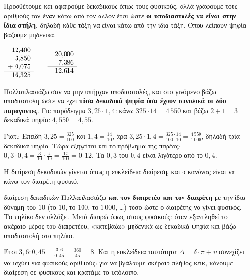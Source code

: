

Προσθέτουμε και αφαιρούμε δεκαδικούς όπως τους φυσικούς, αλλά γράφουμε τους αριθμούς τον έναν κάτω από τον άλλον έτσι ώστε \textbf{οι υποδιαστολές να είναι στην ίδια στήλη}, δηλαδή κάθε τάξη να είναι κάτω από την ίδια τάξη. Όπου λείπουν ψηφία βάζουμε μηδενικά.
\begin{center}
$\begin{array}{r@{}l}
 12&{,}400\\
 3&{,}850\\
 {+}\ 0&{,}075\\\hline
 16&{,}325
\end{array}\qquad
\begin{array}{r@{}l}
 20&{,}000\\
 {-}\ 7&{,}386\\\hline
 12&{,}614
\end{array}$
\end{center}


Πολλαπλασιάζω σαν να μην υπήρχαν υποδιαστολές, και στο γινόμενο βάζω υποδιαστολή ώστε να έχει \textbf{τόσα δεκαδικά ψηφία όσα έχουν συνολικά οι δύο παράγοντες}. Για παράδειγμα $3{,}25\cdot1{,}4$: κάνω $325\cdot14=4\,550$ και βάζω $2+1=3$ δεκαδικά ψηφία: $4{,}550=4{,}55$.

Γιατί; Επειδή $3{,}25=\frac{325}{100}$ και $1{,}4=\frac{14}{10}$, άρα $3{,}25\cdot1{,}4=\frac{325\cdot14}{100\cdot10}=\frac{4\,550}{1\,000}$, δηλαδή τρία δεκαδικά ψηφία. Τώρα εξηγείται και το πρόβλημα της παρέας: $0{,}3\cdot0{,}4=\frac{3}{10}\cdot\frac{4}{10}=\frac{12}{100}=0{,}12$. Τα $0{,}3$ του $0{,}4$ είναι λιγότερο από το $0{,}4$.


Η διαίρεση δεκαδικών γίνεται όπως η ευκλείδεια διαίρεση, και ο κανόνας είναι να κάνω τον διαιρέτη φυσικό.

\begin{kanonas}{διαίρεση δεκαδικών}
Πολλαπλασιάζω \textbf{και τον διαιρετέο και τον διαιρέτη} με την ίδια δύναμη του $10$ (το $10$, το $100$, το $1\,000$, \dots) τόσο ώστε ο διαιρέτης να γίνει φυσικός. Το πηλίκο δεν αλλάζει. Μετά διαιρώ όπως στους φυσικούς: όταν εξαντληθεί το ακέραιο μέρος του διαιρετέου, «κατεβάζω» μηδενικά ως δεκαδικά ψηφία και βάζω υποδιαστολή στο πηλίκο.
\end{kanonas}

Έτσι $3{,}6:0{,}45=\frac{3{,}6}{0{,}45}=\frac{360}{45}=8$. Και η ευκλείδεια ταυτότητα $Δ=\delta\cdot\pi+\upsilon$ συνεχίζει να ισχύει για φυσικούς αριθμούς: για να βγάλουμε ακέραιο πλήθος κέικ, κάνουμε διαίρεση σε φυσικούς και κρατάμε το υπόλοιπο.

